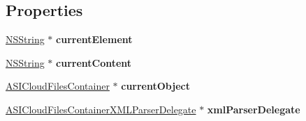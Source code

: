 \subsection*{\-Properties}
\begin{DoxyCompactItemize}
\item 
\hypertarget{interface_a_s_i_cloud_files_container_request_a2e394cd6365150dc6e43ea0c0c42a729}{
\hyperlink{class_n_s_string}{\-N\-S\-String} $\ast$ {\bfseries current\-Element}}
\label{interface_a_s_i_cloud_files_container_request_a2e394cd6365150dc6e43ea0c0c42a729}

\item 
\hypertarget{interface_a_s_i_cloud_files_container_request_af8d7d441b44a73d3d30198df24eed7e7}{
\hyperlink{class_n_s_string}{\-N\-S\-String} $\ast$ {\bfseries current\-Content}}
\label{interface_a_s_i_cloud_files_container_request_af8d7d441b44a73d3d30198df24eed7e7}

\item 
\hypertarget{interface_a_s_i_cloud_files_container_request_aeece5a2bfb59f83a721292bf77718d56}{
\hyperlink{interface_a_s_i_cloud_files_container}{\-A\-S\-I\-Cloud\-Files\-Container} $\ast$ {\bfseries current\-Object}}
\label{interface_a_s_i_cloud_files_container_request_aeece5a2bfb59f83a721292bf77718d56}

\item 
\hypertarget{interface_a_s_i_cloud_files_container_request_ab0054ec5cbe40cc3731b483f84f46837}{
\hyperlink{interface_a_s_i_cloud_files_container_x_m_l_parser_delegate}{\-A\-S\-I\-Cloud\-Files\-Container\-X\-M\-L\-Parser\-Delegate} $\ast$ {\bfseries xml\-Parser\-Delegate}}
\label{interface_a_s_i_cloud_files_container_request_ab0054ec5cbe40cc3731b483f84f46837}

\end{DoxyCompactItemize}


